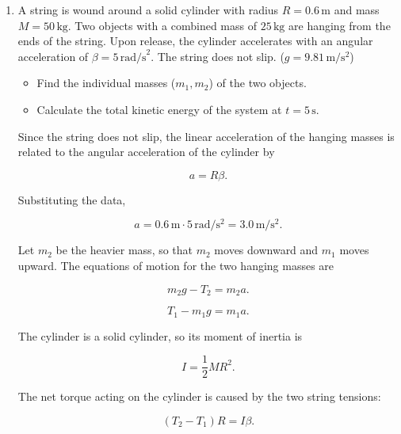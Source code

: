\documentclass[letterpaper,12pt]{letter}
\begin{document}
\begin{enumerate}[label=\Roman*.]
\begin{enumerate}[label=\arabic*.]
\item A string is wound around a solid cylinder with radius $R = 0.6\,\text{m}$ and mass $M = 50\,\text{kg}$. Two objects with a combined mass of $25\,\text{kg}$ are hanging from the ends of the string. Upon release, the cylinder accelerates with an angular acceleration of $\beta = 5\,\text{rad/s}^2$. The string does not slip. ($g=9.81\,\mathrm{m/s^{2}}$)     
\begin{itemize}
    \item[(a)] Find the individual masses ($m_1, m_2$) of the two objects.
    \item[(b)] Calculate the total kinetic energy of the system at $t = 5\,\text{s}$.
\end{itemize}

\bigskip

\begin{center}
\end{center}

Since the string does not slip, the linear acceleration of the hanging masses is related to the angular acceleration of the cylinder by

$$a=R\beta.$$

Substituting the data,

$$a=0.6\,\mathrm{m}\cdot5\,\mathrm{rad/s^2}=3.0\,\mathrm{m/s^2}.$$

Let $m_2$ be the heavier mass, so that $m_2$ moves downward and $m_1$ moves upward. The equations of motion for the two hanging masses are

$$m_2g-T_2=m_2a.$$

$$T_1-m_1g=m_1a.$$

The cylinder is a solid cylinder, so its moment of inertia is

$$I=\frac{1}{2}MR^2.$$

The net torque acting on the cylinder is caused by the two string tensions:

$$(T_2-T_1)R=I\beta.$$


\end{enumerate}
\end{enumerate}
\end{document}
